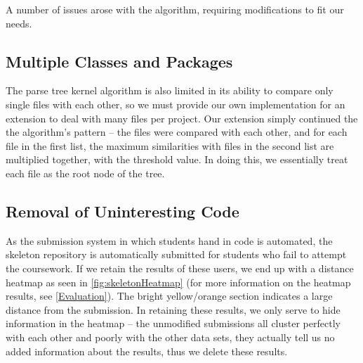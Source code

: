A number of issues arose with the algorithm, requiring modifications to fit our
needs. 

\subsection{Multiple Classes and Packages}

The parse tree kernel algorithm is also limited in its ability to compare only
single files with each other, so we must provide our own implementation for
an extension to deal with many files per project. Our extension simply continued
the the algorithm's pattern -- the files were compared with each other, and for
each file in the first list, the maximum similarities with files in the second
list are multiplied together, with the threshold value. In doing this, we essentially
treat each file as the root node of the tree.

\subsection{Removal of Uninteresting Code}

As the submission system in which students hand in code is automated, the 
skeleton repository is automatically submitted for students who fail to attempt
the coursework. If we retain the results of these users, we end up with a
distance heatmap as seen in \cref{fig:skeletonHeatmap} (for more information on
the heatmap results, see \cref{Evaluation}). The bright yellow/orange section indicates
a large distance from the submission. In retaining these results, we only serve to
hide information in the heatmap -- the unmodified submissions all cluster perfectly
with each other and poorly with the other data sets, they actually tell us no added
information about the results, thus we delete these results.


